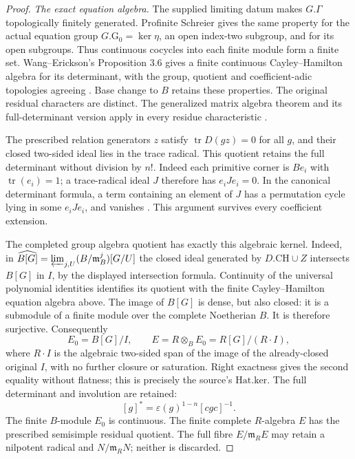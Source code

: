 \begin{proof}
\emph{The exact equation algebra.}
The supplied limiting datum makes \(G.\Gamma\) topologically
finitely generated.  Profinite Schreier gives the same property for
the actual equation group \(G.\mathrm G_0=\ker\eta\), an open
index-two subgroup, and for its open subgroups.  Thus continuous
cocycles into each finite module form a finite set.
Wang--Erickson's Proposition 3.6 gives a
finite continuous Cayley--Hamilton algebra for its determinant,
with the group, quotient and coefficient-adic topologies agreeing
\cite{SelmerModelWE}.  Base change to \(B\) retains these properties.
The original residual characters are distinct.  The
generalized matrix algebra theorem and its full-determinant
version apply in every residue characteristic
\cite[Theorem 2.22]{SelmerModelChenevier}
\cite[Theorem 2.27]{SelmerModelWE}.

The prescribed relation generators \(z\) satisfy
\(\operatorname{tr}D(gz)=0\) for all \(g\), and their closed
two-sided ideal lies in the trace radical.  This quotient retains
the full determinant without division by \(n!\).  Indeed each
primitive corner is \(Be_i\) with \(\operatorname{tr}(e_i)=1\);
a trace-radical ideal \(J\) therefore has \(e_iJe_i=0\).
In the canonical determinant formula, a term containing an
element of \(J\) has a permutation cycle lying in some
\(e_iJe_i\), and vanishes
\cite[Proposition 2.23]{SelmerModelWE}.  This argument survives
every coefficient extension.

The completed group algebra quotient has exactly this algebraic
kernel.  Indeed, in
\(\widehat{B[G]}=\varprojlim_{j,U}(B/\mathfrak m_B^j)[G/U]\)
the closed ideal generated by \(D.\mathrm{CH}\cup Z\) intersects
\(B[G]\) in \(I\), by the displayed intersection formula.
Continuity of the universal polynomial identities identifies its
quotient with the finite Cayley--Hamilton equation algebra above.
The image of \(B[G]\) is dense, but also closed: it is a submodule
of a finite module over the complete Noetherian \(B\).  It is
therefore surjective.  Consequently
\[
 E_0=B[G]/I,\qquad
 E=R\otimes_BE_0=R[G]/(R\cdot I),
\]
where \(R\cdot I\) is the algebraic two-sided span of the image of
the already-closed original \(I\), with no further closure or
saturation.  Right exactness gives the second equality without
flatness; this is precisely the source's \(\mathrm{Hat.ker}\).
The full determinant and involution are retained:
\[
                     [g]^*=\varepsilon(g)^{1-n}[cgc]^{-1}.
\]
The finite \(B\)-module \(E_0\) is continuous.  The finite complete
\(R\)-algebra \(E\) has the prescribed semisimple residual quotient.
The full fibre \(E/\mathfrak m_RE\) may retain a nilpotent radical
and \(N/\mathfrak m_RN\); neither is discarded.


\end{proof}
